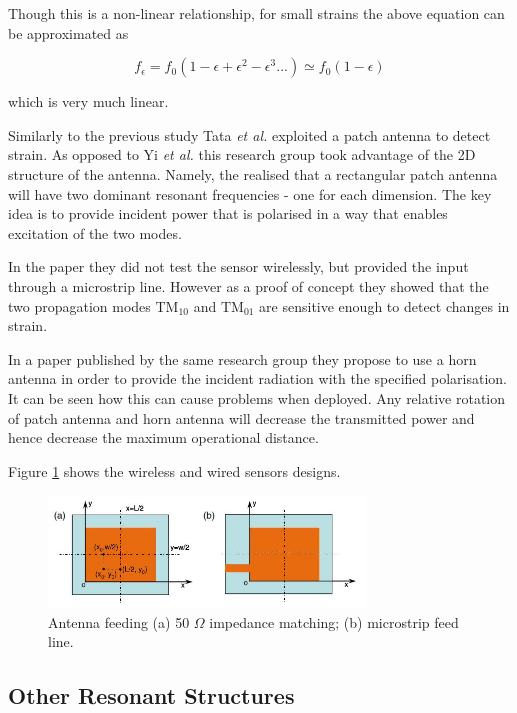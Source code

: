 \documentclass[11pt,a4paper]{article}
\begin{document}
Though this is a non-linear relationship, for small strains the above equation can be approximated as

\begin{equation}
f_{\epsilon} = f_0(1-\epsilon+\epsilon ^2-\epsilon ^3 ... ) \simeq f_0(1-\epsilon)
\end{equation}

which is very much linear.

Similarly to the previous study Tata \textit{et al.} \cite{patch} exploited a patch antenna to detect strain. As opposed to Yi \textit{et al.} this research group took advantage of the 2D structure of the antenna. Namely, the realised that a rectangular patch antenna will have two dominant resonant frequencies  - one for each dimension. The key idea is to provide incident power that is polarised in a way that enables excitation of the two modes.

In the paper they did not test the sensor wirelessly, but provided the input through a microstrip line. However as a proof of concept they showed that the two propagation modes TM$_{10}$ and TM$_{01}$ are sensitive enough to detect changes in strain.

In a paper \cite{horn} published by the same research group they propose to use a horn antenna in order to provide the incident radiation with the specified polarisation. It can be seen how this can cause problems when deployed. Any relative rotation of patch antenna and horn antenna will decrease the transmitted power and hence decrease the maximum operational distance.

Figure \ref{fig:patch} shows the wireless and wired sensors designs.

\begin{figure}[h]
\centering
\includegraphics[width=0.75\textwidth]{patch.JPG}
\caption{Antenna feeding (a) 50 $\Omega$ impedance matching; (b) microstrip feed line.\cite{horn}\label{fig:patch}}
\end{figure}

\subsection{Other Resonant Structures}
\end{document}
